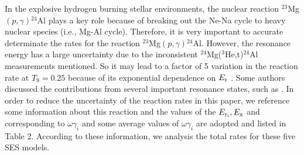 \documentclass[manuscript]{aastex}
\begin{document}
In the explosive hydrogen burning stellar environments, the nuclear
reaction $^{23}$Mg$(p,\gamma)$$^{24}$Al plays a key role because of
breaking out the Ne-Na cycle to heavy nuclear species (i.e., Mg-Al
cycle). Therefore, it is very important to accurate determinate the
rates for the reaction $^{23}$Mg$(p, \gamma)$$^{24}$Al. However, the
resonance energy has a large uncertainty due to the inconsistent
$^{24}$Mg($^3$He,t)$^{24}$Al measurements mentioned. So it may lead
to a factor of 5 variation in the reaction rate at $T_9=0.25$
because of its exponential dependence on $E_{\rm{r}}$
\citep{Visser07}. Some authors discussed the contributions from
several important resonance states, such as \citep{Wallace81,
Wiescher86, Kubono95, Visser07}. In order to reduce the uncertainty
of the reaction rates in this paper, we reference some information
about this reaction and the values of the $E_{\rm{{r_{i}}}},
E_{\rm{x}}$ and corresponding to $\omega \gamma_{i}$ and some
average values of $\omega \gamma_{i}$ are adopted and listed in
Table 2. According to these information, we analysis the total rates
for these five SES models.
\end{document}
